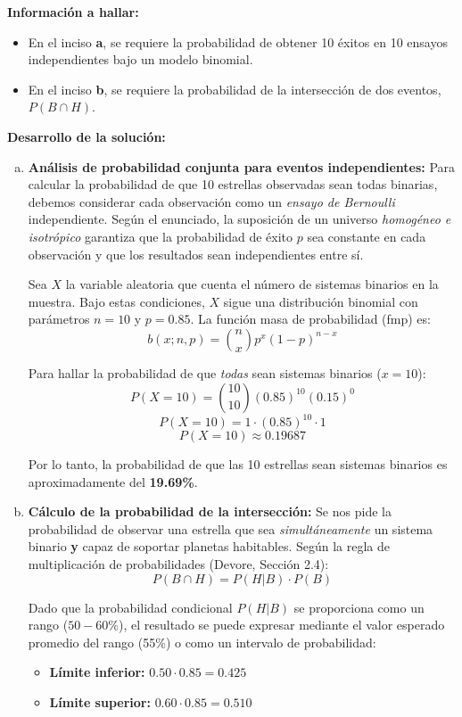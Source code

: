 \documentclass[a4paper]{article}
\begin{document}
\textbf{Información a hallar:}
\begin{itemize}
    \item En el inciso \textbf{a}, se requiere la probabilidad de obtener 10 éxitos en 10 ensayos independientes bajo un modelo binomial.
    \item En el inciso \textbf{b}, se requiere la probabilidad de la intersección de dos eventos, $P(B \cap H)$.
\end{itemize}

\textbf{Desarrollo de la solución:}

\begin{enumerate}[a.]
    \item \textbf{Análisis de probabilidad conjunta para eventos independientes:}
    Para calcular la probabilidad de que 10 estrellas observadas sean todas binarias, debemos considerar cada observación como un \textit{ensayo de Bernoulli} independiente. Según el enunciado, la suposición de un universo \textit{homogéneo e isotrópico} garantiza que la probabilidad de éxito $p$ sea constante en cada observación y que los resultados sean independientes entre sí.
    
    Sea $X$ la variable aleatoria que cuenta el número de sistemas binarios en la muestra. Bajo estas condiciones, $X$ sigue una distribución binomial con parámetros $n=10$ y $p=0.85$. La función masa de probabilidad (fmp) es:
    $$ b(x; n, p) = \binom{n}{x} p^x (1-p)^{n-x} $$
    
    Para hallar la probabilidad de que \textit{todas} sean sistemas binarios ($x=10$):
    $$ P(X = 10) = \binom{10}{10} (0.85)^{10} (0.15)^0 $$
    $$ P(X = 10) = 1 \cdot (0.85)^{10} \cdot 1 $$
    $$ P(X = 10) \approx 0.19687 $$
    
    Por lo tanto, la probabilidad de que las 10 estrellas sean sistemas binarios es aproximadamente del \textbf{19.69\%}.

    \item \textbf{Cálculo de la probabilidad de la intersección:}
    Se nos pide la probabilidad de observar una estrella que sea \textit{simultáneamente} un sistema binario \textbf{y} capaz de soportar planetas habitables. Según la regla de multiplicación de probabilidades (Devore, Sección 2.4):
    $$ P(B \cap H) = P(H|B) \cdot P(B) $$
    
    Dado que la probabilidad condicional $P(H|B)$ se proporciona como un rango ($50-60\%$), el resultado se puede expresar mediante el valor esperado promedio del rango (55\%) o como un intervalo de probabilidad:
    \begin{itemize}
        \item \textbf{Límite inferior:} $0.50 \cdot 0.85 = 0.425$
        \item \textbf{Límite superior:} $0.60 \cdot 0.85 = 0.510$
    \end{itemize}
    

\end{enumerate}
\end{document}

